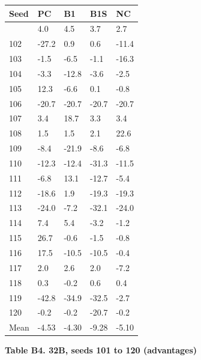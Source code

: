 \documentclass[11pt]{article}
\begin{document}
{\def\LTcaptype{none} %
\begin{longtable}[]{@{}lllll@{}}
\toprule\noalign{}
Seed & PC & B1 & B1S & NC \\
\midrule\noalign{}
\endhead
\bottomrule\noalign{}
\endlastfoot
101 & 4.0 & 4.5 & 3.7 & 2.7 \\
102 & -27.2 & 0.9 & 0.6 & -11.4 \\
103 & -1.5 & -6.5 & -1.1 & -16.3 \\
104 & -3.3 & -12.8 & -3.6 & -2.5 \\
105 & 12.3 & -6.6 & 0.1 & -0.8 \\
106 & -20.7 & -20.7 & -20.7 & -20.7 \\
107 & 3.4 & 18.7 & 3.3 & 3.4 \\
108 & 1.5 & 1.5 & 2.1 & 22.6 \\
109 & -8.4 & -21.9 & -8.6 & -6.8 \\
110 & -12.3 & -12.4 & -31.3 & -11.5 \\
111 & -6.8 & 13.1 & -12.7 & -5.4 \\
112 & -18.6 & 1.9 & -19.3 & -19.3 \\
113 & -24.0 & -7.2 & -32.1 & -24.0 \\
114 & 7.4 & 5.4 & -3.2 & -1.2 \\
115 & 26.7 & -0.6 & -1.5 & -0.8 \\
116 & 17.5 & -10.5 & -10.5 & -0.4 \\
117 & 2.0 & 2.6 & 2.0 & -7.2 \\
118 & 0.3 & -0.2 & 0.6 & 0.4 \\
119 & -42.8 & -34.9 & -32.5 & -2.7 \\
120 & -0.2 & -0.2 & -20.7 & -0.2 \\
Mean & -4.53 & -4.30 & -9.28 & -5.10 \\
\end{longtable}
}

\textbf{Table B4. 32B, seeds 101 to 120 (advantages)}
\end{document}
